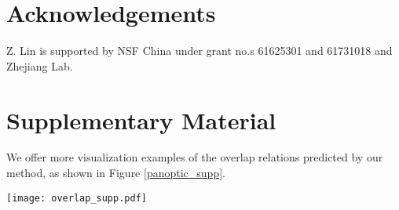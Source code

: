\documentclass[letterpaper]{article} \usepackage{aaai20}  \usepackage{times}  \usepackage{helvet} \usepackage{courier}  \usepackage[hyphens]{url}  \usepackage{graphicx} \urlstyle{rm} \def\UrlFont{\rm}  \usepackage{graphicx}  \frenchspacing  \setlength{\pdfpagewidth}{8.5in}  \setlength{\pdfpageheight}{11in}
\begin{document}
\section{Acknowledgements}

Z. Lin is supported by NSF China under grant no.s 61625301 and 61731018 and Zhejiang Lab. 



\section{Supplementary Material}

We offer more visualization examples of the overlap relations predicted by our method, as shown in Figure \ref{panoptic_supp}.

\begin{figure*}[]
\begin{center}
		\texttt{[image: overlap\_supp.pdf]}
	\end{center}
	\caption{More visualization examples of the overlap relations predicted from  in SOGNet, and their corresponding approximate ground truths, . Note that the activation on location  represents that instance  is covered by (lies below) instance . The indices of instances are marked in the images. Zoom in to have a better view.}
	\label{panoptic_supp}
	\vspace{-3mm}
\end{figure*}

\newpage

\newpage


\end{document}
